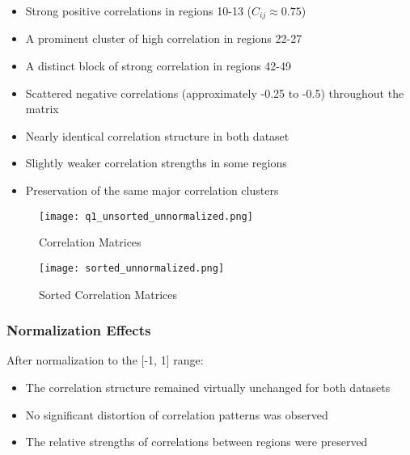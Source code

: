 \documentclass[12pt]{article}
\begin{document}
\begin{itemize}
        \item Strong positive correlations in regions 10-13 ($C_{ij} \approx 0.75$)
        \item A prominent cluster of high correlation in regions 22-27
        \item A distinct block of strong correlation in regions 42-49
        \item Scattered negative correlations (approximately -0.25 to -0.5) throughout the matrix
    
        \item Nearly identical correlation structure in both dataset
        \item Slightly weaker correlation strengths in some regions
        \item Preservation of the same major correlation clusters
\end{itemize}
\begin{figure}[H]
    \centering
    \texttt{[image: q1\_unsorted\_unnormalized.png]}
    \caption{Correlation Matrices}
    \label{fig:enter-label}
\end{figure}
\begin{figure}[H]
    \centering
    \texttt{[image: sorted\_unnormalized.png]}
    \caption{Sorted Correlation Matrices}
    \label{fig:enter-label}
\end{figure}
\subsubsection{Normalization Effects}
After normalization to the [-1, 1] range:
\begin{itemize}
    \item The correlation structure remained virtually unchanged for both datasets
    \item No significant distortion of correlation patterns was observed
    \item The relative strengths of correlations between regions were preserved
\end{itemize}
\end{document}
